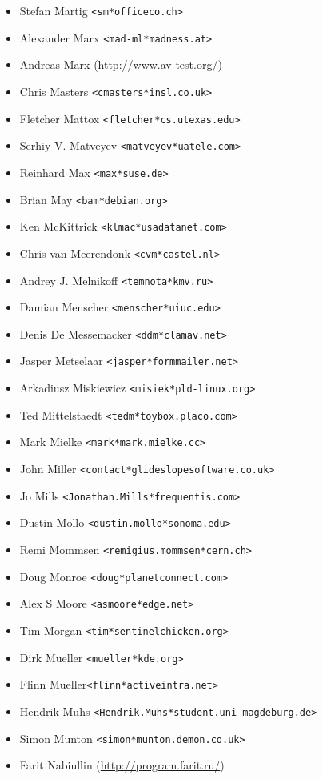 \documentclass[a4paper,titlepage,12pt]{article}
\newcommand{\email}[1]{\texttt{#1}}
\begin{document}
\begin{itemize}
	\item Stefan Martig \email{<sm*officeco.ch>}
	\item Alexander Marx \email{<mad-ml*madness.at>}
	\item Andreas Marx (\url{http://www.av-test.org/})
	\item Chris Masters \email{<cmasters*insl.co.uk>}
	\item Fletcher Mattox \email{<fletcher*cs.utexas.edu>}
	\item Serhiy V. Matveyev \email{<matveyev*uatele.com>}
	\item Reinhard Max \email{<max*suse.de>}
	\item Brian May \email{<bam*debian.org>}
	\item Ken McKittrick \email{<klmac*usadatanet.com>}
	\item Chris van Meerendonk \email{<cvm*castel.nl>}
	\item Andrey J. Melnikoff \email{<temnota*kmv.ru>}
	\item Damian Menscher \email{<menscher*uiuc.edu>}
	\item Denis De Messemacker \email{<ddm*clamav.net>}
	\item Jasper Metselaar \email{<jasper*formmailer.net>}
	\item Arkadiusz Miskiewicz \email{<misiek*pld-linux.org>}
	\item Ted Mittelstaedt \email{<tedm*toybox.placo.com>}
	\item Mark Mielke \email{<mark*mark.mielke.cc>}
	\item John Miller \email{<contact*glideslopesoftware.co.uk>}
	\item Jo Mills \email{<Jonathan.Mills*frequentis.com>}
	\item Dustin Mollo \email{<dustin.mollo*sonoma.edu>}
	\item Remi Mommsen \email{<remigius.mommsen*cern.ch>}
	\item Doug Monroe \email{<doug*planetconnect.com>}
	\item Alex S Moore \email{<asmoore*edge.net>}
	\item Tim Morgan \email{<tim*sentinelchicken.org>}
	\item Dirk Mueller \email{<mueller*kde.org>}
	\item Flinn Mueller\email{<flinn*activeintra.net>}
	\item Hendrik Muhs \email{<Hendrik.Muhs*student.uni-magdeburg.de>}
	\item Simon Munton \email{<simon*munton.demon.co.uk>}
	\item Farit Nabiullin (\url{http://program.farit.ru/})

\end{itemize}
\end{document}
